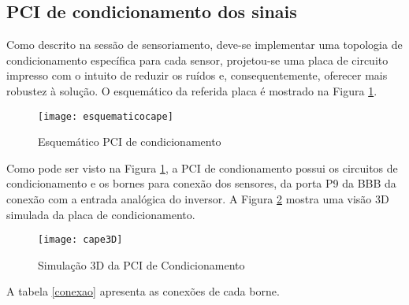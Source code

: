 \subsection{PCI de condicionamento dos sinais}

	Como descrito na sessão de sensoriamento, deve-se implementar uma topologia de condicionamento específica para cada sensor, projetou-se uma placa de circuito impresso com o intuito de reduzir os ruídos e, consequentemente, oferecer mais robustez à solução. O esquemático da referida placa é mostrado na Figura \ref{cape}. 

	\begin{figure}[!h]
		\centering
		\texttt{[image: esquematicocape]}
		\caption{Esquemático PCI de condicionamento}
		\label{cape}
	\end{figure}

	Como pode ser visto na Figura \ref{cape}, a PCI de condionamento possui os circuitos de condicionamento e os bornes para conexão dos sensores, da porta P9 da BBB da conexão com a entrada analógica do inversor. A Figura \ref{cape3D} mostra uma  visão 3D simulada da placa de condicionamento.

	\begin{figure}[!h]
		\centering
		\texttt{[image: cape3D]}
		\caption{Simulação 3D da PCI de Condicionamento}
		\label{cape3D}
	\end{figure}

	A tabela \ref{conexao} apresenta as conexões de cada borne. 


